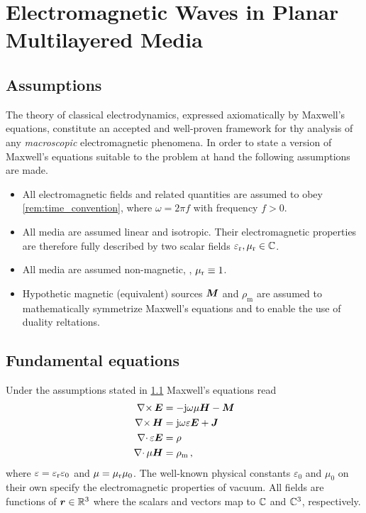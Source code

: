 \section{Electromagnetic Waves in Planar Multilayered Media}

\subsection{Assumptions}
\label{subsec:em_assumptions}

The theory of classical electrodynamics, expressed axiomatically by Maxwell's
equations, constitute an accepted and well-proven framework for thy analysis of any \emph{macroscopic} electromagnetic phenomena. In order to state a version of Maxwell's equations suitable to the problem at hand the following assumptions are made.
\begin{itemize}
	\item All electromagnetic fields and related quantities are assumed to obey
	\cref{rem:time_convention}, where $\omega = 2\pi f$ with frequency $f > 0$.
	\item All media are assumed linear and isotropic. Their electromagnetic
	properties are therefore fully described by two scalar fields
	$\varepsilon_{\mathrm{r}}, \mu_{\mathrm{r}} \in \mathbb{C}$.
	\item All media are assumed non-magnetic, \ie, $\mu_{\mathrm{r}} \equiv 1$.
	\item Hypothetic magnetic (equivalent) sources $\pvec{M}$ and
	$\rho_\mathrm{m}$ are assumed to mathematically symmetrize Maxwell's
	equations and to enable the use of duality reltations.
\end{itemize}

\subsection{Fundamental equations}
\label{subsec:em_fundamental_equations}

Under the assumptions stated in \cref{subsec:em_assumptions} Maxwell's equations
read \cite{Chew1999}
\begin{subequations}\label{eq:mwe_fd}
	\begin{align}
		\curl \pvec{E}
		&= -\im\omega\mu\pvec{H} -\pvec{M} \label{eq:mwe_fd_faraday} \\
		\curl \pvec{H}
		&= \im\omega\varepsilon\pvec{E} + \pvec{J} \label{eq:mwe_fd_ampere} \\
		\divergence \varepsilon\pvec{E}
		&= \rho \label{eq:mwe_fd_gauss} \\
		\divergence \mu\pvec{H}
		&= \rho_\mathrm{m} \,, \label{eq:mwe_fd_gauss_magnetic}
	\end{align}
\end{subequations}
where $\varepsilon = \varepsilon_{\mathrm{r}} \varepsilon_0$ and $\mu = \mu_{\mathrm{r}} \mu_0$. The well-known
physical constants $\varepsilon_0$ and $\mu_0$ on their own specify the
electromagnetic properties of vacuum.
All fields are functions of $\robs \in \R^3$ where the scalars and vectors map
to $\mathbb{C}$ and $\mathbb{C}^3$, respectively.

